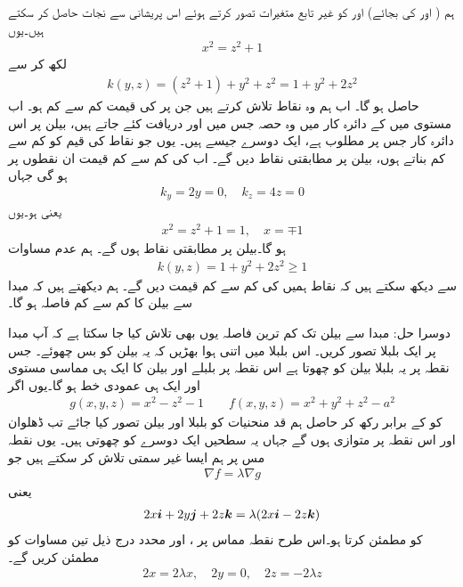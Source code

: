 ہم ( اور  کی بجائے)     اور  کو غیر تابع متغیرات تصور کرتے ہوئے اس  پریشانی سے نجات حاصل کر سکتے ہیں۔یوں
\begin{align*}
x^2=z^2+1
\end{align*}
لکھ کر  سے 
\begin{align*}
k(y,z)=(z^2+1)+y^2+z^2=1+y^2+2z^2
\end{align*}
حاصل  ہو گا۔ اب  ہم وہ نقاط تلاش کرتے ہیں جن پر  کی قیمت کم سے کم ہو۔ اب  مستوی میں  کے دائرہ کار میں وہ حصہ جس میں  اور  دریافت کئے جاتے ہیں، بیلن  پر اس دائرہ کار جس پر   مطلوب ہے،   ایک دوسرے    جیسے ہیں۔ یوں جو نقاط  کی قیم کو کم سے کم بناتے ہوں، بیلن پر مطابقتی نقاط  دیں گے۔ اب  کی کم سے کم قیمت ان نقطوں پر ہو گی جہاں
\begin{align*}
k_y=2y=0,\quad k_z=4z=0
\end{align*}
یعنی  ہو۔یوں
\begin{align*}
x^2=z^2+1=1,\quad x=\mp 1
\end{align*}
ہو گا۔بیلن پر مطابقتی نقاط  ہوں گے۔ ہم عدم مساوات
\begin{align*}
k(y,z)=1+y^2+2z^2\ge 1
\end{align*}
سے دیکھ سکتے ہیں کہ نقاط  ہمیں  کی کم سے کم قیمت دیں گے۔ ہم  دیکھتے  ہیں کہ مبدا سے بیلن کا کم سے کم فاصلہ  ہو گا۔

دوسرا حل:\quad
مبدا سے بیلن تک کم ترین فاصلہ یوں بھی تلاش کیا جا سکتا ہے کہ آپ مبدا پر ایک بلبلا  تصور کریں۔ اس بلبلا میں اتنی ہوا بھڑیں  کہ یہ بیلن کو   بس چھوئے۔ جس نقطہ پر یہ بلبلا بیلن کو چھوتا ہے اس نقطہ پر  بلبلے اور بیلن کا ایک ہی مماسی مستوی  اور ایک ہی عمودی خط ہو گا۔یوں اگر
\begin{align*}
g(x,y,z)=x^2-z^2-1\quad \text{}\quad f(x,y,z)=x^2+y^2+z^2-a^2
\end{align*}
کو  کے برابر رکھ کر   حاصل ہم قد منحنیات کو   بلبلا اور بیلن تصور کیا جائے  تب ڈھلوان  اور   اس نقطہ پر متوازی ہوں گے جہاں یہ سطحیں ایک دوسرے کو چھوتی  ہیں۔ یوں  نقطہ مس  پر ہم ایسا غیر سمتی   تلاش کر سکتے ہیں جو
\begin{align*}
\nabla f=\lambda \nabla g
\end{align*}
یعنی
\begin{align*}
2x{\boldsymbol{i}}+2y{\boldsymbol{j}}+2z{\boldsymbol{k}}=\lambda(2x{\boldsymbol{i}}-2z{\boldsymbol{k}})
\end{align*}
کو مطمئن کرتا ہو۔اس طرح نقطہ مماس پر ،  اور  محدد درج ذیل تین مساوات کو مطمئن کریں گے۔
\begin{align}\label{مساوات_کثیرالمتغیر_مماسی_نقطہ_شرط}
2x=2\lambda x,\quad 2y=0,\quad 2z=-2\lambda z
\end{align}

